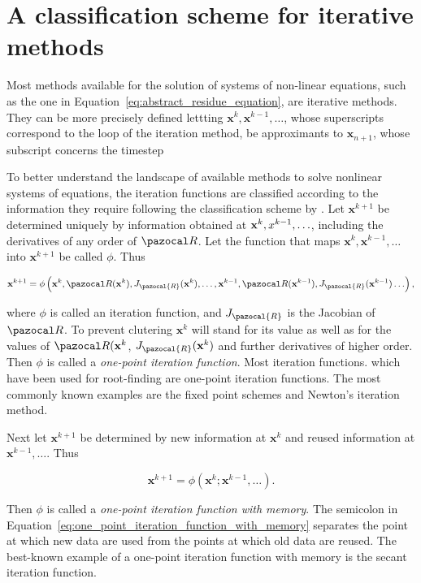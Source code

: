 
\section{A classification scheme for iterative methods}

Most methods available for the solution of systems of non-linear equations, such as the one in Equation~\eqref{eq:abstract_residue_equation}, are iterative methods.
They can be more precisely defined lettting \(\mathbf x^{k},\mathbf x^{k-1}, \ldots\), whose superscripts correspond to the loop of the iteration method, be approximants to \(\mathbf x_{n+1}\), whose subscript concerns the timestep

To better understand the landscape of available methods to solve nonlinear systems of equations, the iteration functions are classified according to the information they require following the classification scheme by \cite{traub_iterative_1982}.
Let \(\mathbf x^{k+1}\) be determined uniquely by information obtained at \(\mathbf x^{k}, \mathbf \mathbf x^{k-1}, \ldots\), including the derivatives of any order of \(\pazocal R\).
Let the function that maps \(\mathbf x^{k}, \mathbf x^{k-1}, \ldots\) into \(\mathbf x^{k+1}\) be called \(\phi\).
Thus
\begin{highlight}
\begin{equation}
  \mathbf x^{k+1}=\phi\left(\mathbf x^{k},\pazocal R(\mathbf x^{k}), J_\pazocal{R}(\mathbf x^k), \dots, \mathbf x^{k-1},\pazocal R(\mathbf x^{k-1}), J_\pazocal{R}(\mathbf x^{k-1}) \ldots\right),
\end{equation}
\end{highlight}
where \(\phi\) is called an iteration function, and \(J_\pazocal{R}\) is the Jacobian of \(\pazocal R\).
To prevent clutering \(\mathbf x^k\) will stand for its value as well as for the values of \(\pazocal R(\mathbf x^k\), \(J_\pazocal{R}(\mathbf x^k)\) and further derivatives of higher order.
Then \(\phi\) is called a \textit{one-point iteration function}.
Most iteration functions. which have been used for root-finding are one-point iteration functions. The most commonly known examples are the fixed point schemes and Newton's iteration method.

Next let \(\mathbf x^{k+1}\) be determined by new information at \(\mathbf x^{k}\) and reused information at \(\mathbf x^{k-1}, \ldots\).
Thus
\begin{highlight}
  \begin{equation}\label{eq:one_point_iteration_function_with_memory}
    \mathbf x^{k+1}=\phi\left(\mathbf x^{k} ; \mathbf x^{k-1}, \ldots\right) .
  \end{equation}
\end{highlight}
Then \(\phi\) is called a \textit{one-point iteration function with memory}.
The semicolon in Equation~\eqref{eq:one_point_iteration_function_with_memory} separates the point at which new data are used from the points at which old data are reused.
The best-known example of a one-point iteration function with memory is the secant iteration function.

